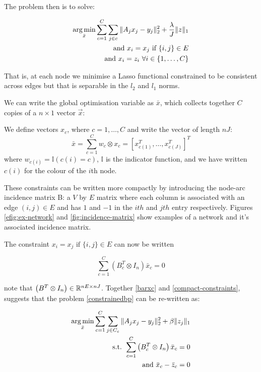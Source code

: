 \documentclass[conference]{IEEEtran}
\begin{document}
The problem then is to solve:

\begin{align}
\argmin_{\bar{x}} \sum_{c=1}^C \sum_{j \in c} \|A_jx_j - y_j\|_2^2 + \frac{\lambda}{J}\|z\|_1 \nonumber \\ 
\text{ and } x_i = x_j \text{ if } \{i,j\} \in E \nonumber \\
\text{ and } x_i = z_i \text{ } \forall i \in \{1, \ldots, C\}
\label{constrainedbp}
\end{align}

That is, at each node we minimise a Lasso functional constrained to be consistent across edges but that is separable in the \(l_2\) and \(l_1\) norms.

We can write the global optimisation variable as \(\bar{x}\), which collects together \(C\) copies of a \(n\times 1\) vector \(\vec{x}\):

\begin{defn}
We define vectors \(x_c\), where \(c = 1,\ldots , C\) and write the vector of length \(nJ\):
\begin{equation}
\bar{x} = \sum_{c=1}^C w_c \otimes x_c = \left[x_{c(1)}^T, \ldots	, x_{c(J)}^T\right]^T
\label{barxc}
\end{equation}
where \(w_{c(i)} = \mathbb{I}(c(i) = c)\), \(\mathbb{I}\) is the indicator function, and we have written \(c(i)\) for the colour of the \(i\)th node.
\end{defn}

These constraints can be written more compactly by introducing the node-arc incidence matrix B: a \(V\) by \(E\) matrix where each column is associated with an edge \(\left(i,j\right) \in E\) and has \(1\) and \(-1\) in the \(ith\) and \(jth\) entry respectively. Figures \eqref{efig:ex-network} and \eqref{fig:incidence-matrix} show examples of a network and it's associated incidence matrix.

The constraint \(x_i = x_j \text{ if } \{i,j\} \in E \) can now be written 

\begin{equation}
\sum_{c=1}^C\left(B_c^T \otimes I_n\right)\bar{x}_c = 0
\label{compact-constraints}
\end{equation}

note that \(\left(B^T\otimes I_n \right) \in {\mathbb{R}}^{nE \times nJ}\). Together \eqref{barxc} and \eqref{compact-constraints}, suggests that the problem \eqref{constrainedbp} can be re-written as:

\begin{align}
\argmin_{\bar{x}} \sum_{c=1}^C \sum_{j \in C_c} \|A_jx_j - y_j\|_2^2 + \beta\|z_j\|_1
\nonumber \\
\text{ s.t. } \sum_{c=1}^C\left(B_c^T \otimes I_n\right)\bar{x}_c = 0 \nonumber \\
\text{ and } \bar{x}_c - \bar{z}_c = 0
\label{constrainedbp1}
\end{align}
\end{document}
